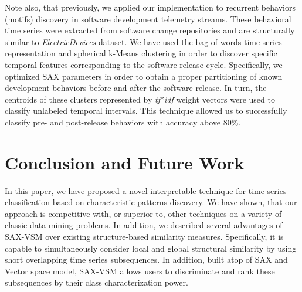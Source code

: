 \documentclass{llncs}
\begin{document}
Note also, that previously, we applied our implementation to recurrent behaviors (motifs) 
discovery in software development telemetry streams\cite{android}. 
These behavioral time series were extracted from software change repositories and are 
structurally similar to \textit{ElectricDevices} dataset. 
We have used the bag of words time series representation and spherical k-Means clustering 
in order to discover specific temporal features corresponding to the software release cycle. 
Specifically, we optimized SAX parameters in order to obtain a proper partitioning of known 
development behaviors before and after the software release. In turn, the centroids of these 
clusters represented by \textit{tf$\ast$idf} weight vectors were used to classify unlabeled  
temporal intervals. This technique allowed us to successfully classify pre- and post-release
behaviors with accuracy above 80\%.

\section{Conclusion and Future Work}
In this paper, we have proposed a novel interpretable technique for time series classification
based on characteristic patterns discovery. We have shown, that our approach is competitive with, 
or superior to, other techniques on a variety of classic data mining problems. In addition, 
we described several advantages of SAX-VSM over existing structure-based similarity measures.
Specifically, it is capable to simultaneously consider local and global structural similarity by 
using short overlapping time series subsequences. In addition, built atop of SAX and Vector space
model, SAX-VSM allows users to discriminate and rank these subsequences by their class 
characterization power.
\end{document}
